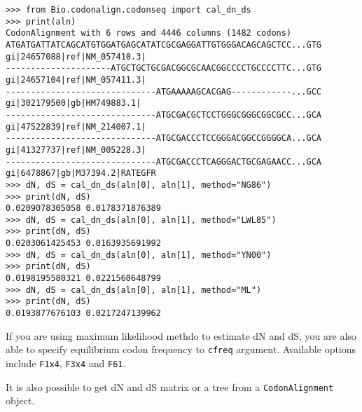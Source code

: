 \documentclass{article}
\begin{document}
\begin{verbatim}
>>> from Bio.codonalign.codonseq import cal_dn_ds
>>> print(aln)
CodonAlignment with 6 rows and 4446 columns (1482 codons)
ATGATGATTATCAGCATGTGGATGAGCATATCGCGAGGATTGTGGGACAGCAGCTCC...GTG gi|24657088|ref|NM_057410.3|
---------------------ATGCTGCTGCGACGGCGCAACGGCCCCTGCCCCTTC...GTG gi|24657104|ref|NM_057411.3|
------------------------------ATGAAAAAGCACGAG------------...GCC gi|302179500|gb|HM749883.1|
------------------------------ATGCGACGCTCCTGGGCGGGCGGCGCC...GCA gi|47522839|ref|NM_214007.1|
------------------------------ATGCGACCCTCCGGGACGGCCGGGGCA...GCA gi|41327737|ref|NM_005228.3|
------------------------------ATGCGACCCTCAGGGACTGCGAGAACC...GCA gi|6478867|gb|M37394.2|RATEGFR
>>> dN, dS = cal_dn_ds(aln[0], aln[1], method="NG86")
>>> print(dN, dS)
0.0209078305058 0.0178371876389
>>> dN, dS = cal_dn_ds(aln[0], aln[1], method="LWL85")
>>> print(dN, dS)
0.0203061425453 0.0163935691992
>>> dN, dS = cal_dn_ds(aln[0], aln[1], method="YN00")
>>> print(dN, dS)
0.0198195580321 0.0221560648799
>>> dN, dS = cal_dn_ds(aln[0], aln[1], method="ML")
>>> print(dN, dS)
0.0193877676103 0.0217247139962
\end{verbatim}

If you are using maximum likelihood methdo to estimate dN and dS, you
are also able to specify equilibrium codon frequency to \texttt{cfreq}
argument. Available options include \texttt{F1x4}, \texttt{F3x4} and
\texttt{F61}.

It is also possible to get dN and dS matrix or a tree from a
\texttt{CodonAlignment} object.
\end{document}
